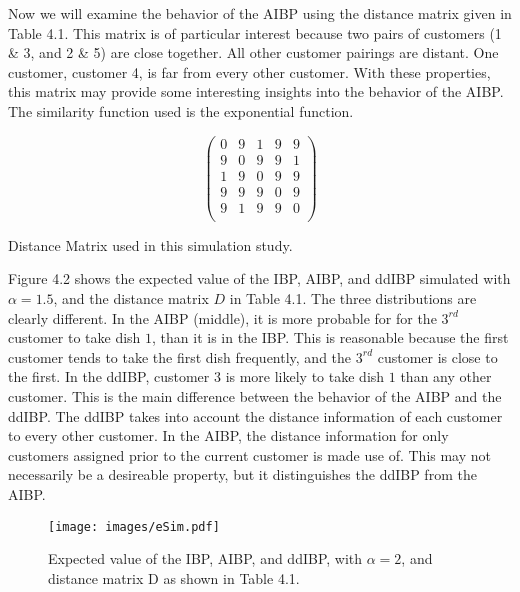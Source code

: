 Now we will examine the behavior of the AIBP using the distance matrix given in 
Table 4.1. This matrix is of particular interest because two pairs of customers
(1 \& 3, and 2 \& 5) are close together. All other customer pairings are distant.
One customer, customer 4, is far from every other customer. With these properties,
this matrix may provide some interesting insights into the behavior of the AIBP.
The similarity function used is the exponential function.\\

\begin{table}[ht]
\centering
\[
  \begin{pmatrix}{}
    0 & 9 & 1 & 9 & 9 \\ 
    9 & 0 & 9 & 9 & 1 \\ 
    1 & 9 & 0 & 9 & 9 \\ 
    9 & 9 & 9 & 0 & 9 \\ 
    9 & 1 & 9 & 9 & 0 \\ 
  \end{pmatrix}
\]
\caption{Distance Matrix used in this simulation study.}
\end{table}


\noindent
Figure 4.2 shows the expected value of the IBP, AIBP, and ddIBP simulated with
$\alpha=1.5$, and the distance matrix $D$ in Table 4.1. The three distributions
are clearly different. In the AIBP (middle), it is more probable for for the
$3^{rd}$ customer to take dish $1$, than it is in the IBP. This is reasonable
because the first customer tends to take the first dish frequently, and the
$3^{rd}$ customer is close to the first. In the ddIBP, customer $3$ is more likely
to take dish $1$ than any other customer. This is the main difference between the 
behavior of the AIBP and the ddIBP. The ddIBP takes into account the distance 
information of each customer to every other customer. In the AIBP, the distance 
information for only customers assigned prior to the current customer is made
use of. This may not necessarily be a desireable property, but it distinguishes 
the ddIBP from the AIBP.\\

\begin{figure}\begin{center}
  \texttt{[image: images/eSim.pdf]}
  \caption{Expected value of the IBP, AIBP, and ddIBP, with $\alpha=2$, and 
           distance matrix D as shown in Table 4.1. }
\end{center}\end{figure}

